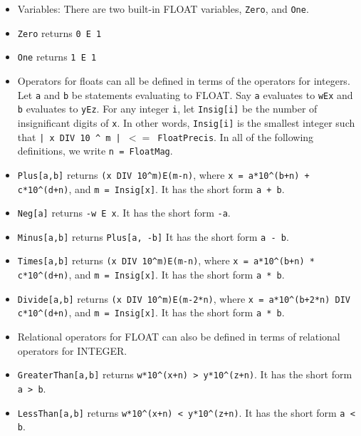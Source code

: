 \begin{itemize}
\item
Variables:  
There are two built-in FLOAT variables, \verb+Zero+, and \verb+One+.

\bd
\item
\verb+Zero+ returns \verb+0 E 1+

\item
\verb+One+ returns \verb+1 E 1+
\ed

\item
Operators for floats can all be defined in terms of the operators for
integers.  Let \verb+a+ and \verb+b+ be statements
evaluating to FLOAT. Say \verb+a+ evaluates to \verb+wEx+ and
\verb+b+ evaluates to \verb+yEz+.  For any integer \verb+i+, let 
\verb+Insig[i]+ be the number of insignificant digits of \verb+x+.  In
other words, \verb+Insig[i]+ is the smallest integer such that 
\verb+| x DIV 10 ^ m | +$<=$\verb+ FloatPrecis+.  In all of the following
definitions, we write \verb+n = FloatMag+.

\bd
\item
\verb+Plus[a,b]+ returns \verb&(x DIV 10^m)E(m-n)&, where 
\verb&x = a*10^(b+n) + c*10^(d+n)&, 
and \verb+m = Insig[x]+.  
It has the short form \verb&a + b&.
 
\item
\verb+Neg[a]+ returns \verb+-w E x+.  It has the short form \verb&-a&.  
 
\item
\verb+Minus[a,b]+ returns \verb+Plus[a, -b]+
It has the short form \verb&a - b&.  

\item
\verb+Times[a,b]+ returns \verb&(x DIV 10^m)E(m-n)&, where 
\verb&x = a*10^(b+n) * c*10^(d+n)&, 
and \verb+m = Insig[x]+.  
It has the short form \verb&a * b&.
 
\item
\verb+Divide[a,b]+ returns \verb&(x DIV 10^m)E(m-2*n)&, where 
\verb&x = a*10^(b+2*n) DIV c*10^(d+n)&, 
and \verb+m = Insig[x]+.  
It has the short form \verb&a * b&.
 
\ed
\item
Relational operators for FLOAT can also be defined in terms of
relational operators for INTEGER.  
\bd
\item
\verb+GreaterThan[a,b]+ returns \verb&w*10^(x+n) > y*10^(z+n)&.
It has the short form \verb+a > b+.

\item 
\verb+LessThan[a,b]+ returns \verb&w*10^(x+n) < y*10^(z+n)&.
It has the short form \verb+a < b+.


\end{itemize}
